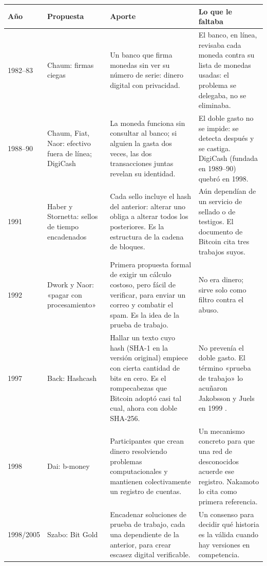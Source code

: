 \documentclass[11pt,a4paper]{article}
\newcommand{\webhint}[1]{}
\begin{document}
\begin{table}[tbp]
\centering
\webhint{table; id=tab-antecedentes; kind=comparison; columns=Año,Propuesta,Aporte,Lo que le faltaba}
\small
\renewcommand{\arraystretch}{1.25}
\begin{tabularx}{\linewidth}{@{}l>{\raggedright\arraybackslash}p{2.9cm}>{\raggedright\arraybackslash}X>{\raggedright\arraybackslash}X@{}}
\toprule
\textbf{Año} & \textbf{Propuesta} & \textbf{Aporte} & \textbf{Lo que le faltaba}\\
\midrule
1982--83 & Chaum: firmas ciegas \cite{chaum1983} & Un banco que firma monedas sin ver su número de serie: dinero digital con privacidad. & El banco, en línea, revisaba cada moneda contra su lista de monedas usadas: el problema se delegaba, no se eliminaba.\\
1988--90 & Chaum, Fiat, Naor: efectivo fuera de línea; DigiCash \cite{chaum1990} & La moneda funciona sin consultar al banco; si alguien la gasta dos veces, las dos transacciones juntas revelan su identidad. & El doble gasto no se impide: se detecta después y se castiga. DigiCash (fundada en 1989--90) quebró en 1998.\\
1991 & Haber y Stornetta: sellos de tiempo encadenados \cite{haber1991} & Cada sello incluye el hash del anterior: alterar uno obliga a alterar todos los posteriores. Es la estructura de la cadena de bloques. & Aún dependían de un servicio de sellado o de testigos. El documento de Bitcoin cita tres trabajos suyos.\\
1992 & Dwork y Naor: «pagar con procesamiento» \cite{dwork1993} & Primera propuesta formal de exigir un cálculo costoso, pero fácil de verificar, para enviar un correo y combatir el spam. Es la idea de la prueba de trabajo. & No era dinero; sirve solo como filtro contra el abuso.\\
1997 & Back: Hashcash \cite{back1997} & Hallar un texto cuyo hash (SHA-1 en la versión original) empiece con cierta cantidad de bits en cero. Es el rompecabezas que Bitcoin adoptó casi tal cual, ahora con doble SHA-256. & No prevenía el doble gasto. El término «prueba de trabajo» lo acuñaron Jakobsson y Juels en 1999 \cite{jakobsson1999}.\\
1998 & Dai: b-money \cite{dai1998} & Participantes que crean dinero resolviendo problemas computacionales y mantienen colectivamente un registro de cuentas. & Un mecanismo concreto para que una red de desconocidos acuerde ese registro. Nakamoto lo cita como primera referencia.\\
1998/2005 & Szabo: Bit Gold \cite{szabo2005} & Encadenar soluciones de prueba de trabajo, cada una dependiente de la anterior, para crear escasez digital verificable. & Un consenso para decidir qué historia es la válida cuando hay versiones en competencia.\\

\end{tabularx}
\end{table}
\end{document}
